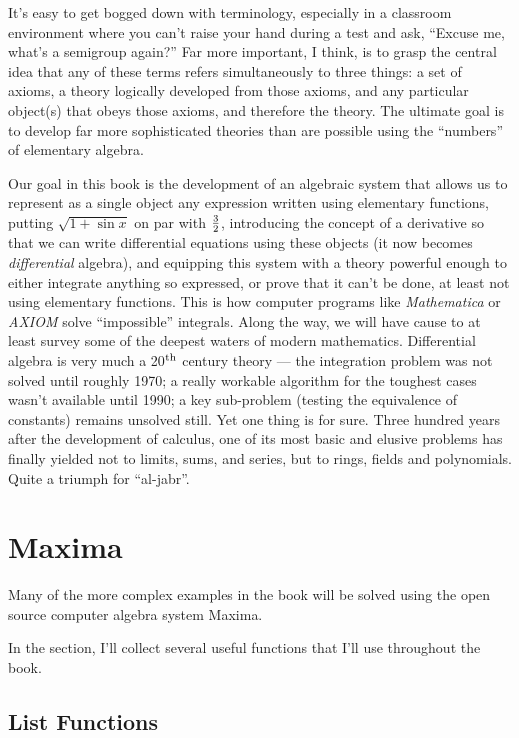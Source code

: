 It's easy to get bogged down with terminology, especially in a
classroom environment where you can't raise your hand during a test
and ask, ``Excuse me, what's a semigroup again?''  Far more important,
I think, is to grasp the central idea that any of these terms refers
simultaneously to three things: a set of axioms, a theory logically
developed from those axioms, and any particular object(s) that obeys
those axioms, and therefore the theory.  The ultimate goal is to
develop far more sophisticated theories than are possible using the
``numbers'' of elementary algebra.

Our goal in this book is the development of an algebraic system that
allows us to represent as a single object any expression written using
elementary functions, putting $\sqrt{1 + \sin x}$ on par with
$3\over2$, introducing the concept of a derivative so that we can
write differential equations using these objects (it now becomes {\it
differential} algebra), and equipping this system with a theory
powerful enough to either integrate anything so expressed, or prove
that it can't be done, at least not using elementary functions.  This
is how computer programs like {\it Mathematica} or {\it AXIOM} solve
``impossible'' integrals.  Along the way, we will have cause to
at least survey some of the deepest waters of modern
mathematics.  Differential algebra is very much a 20$^{\rm th}$
century theory --- the integration problem was not solved until
roughly 1970; a really workable algorithm for the toughest cases
wasn't available until 1990; a key sub-problem (testing the
equivalence of constants) remains unsolved still.  Yet one thing is
for sure.  Three hundred years after the development of calculus, one
of its most basic and elusive problems has finally yielded not to
limits, sums, and series, but to rings, fields and polynomials.  Quite a
triumph for ``al-jabr''.

\vfill\eject
\section{Maxima}

Many of the more complex examples in the book will be solved
using the open source computer algebra system Maxima.

In the section, I'll collect several useful functions
that I'll use throughout the book.

\subsection{List Functions}

